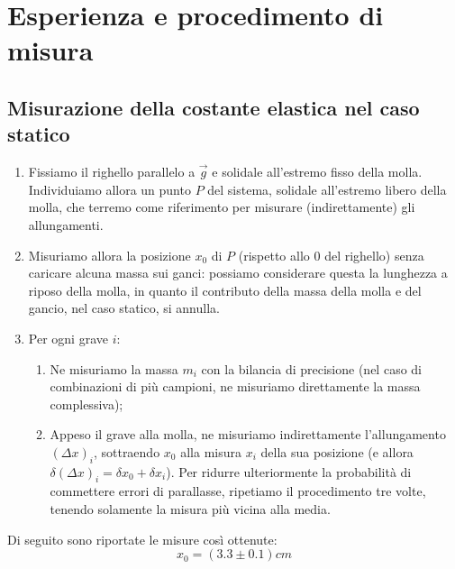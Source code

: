 \documentclass{article}
\begin{document}

\section{Esperienza e procedimento di misura}
\subsection{Misurazione della costante elastica nel caso statico}
\begin{enumerate}
    \item Fissiamo il righello parallelo a $\vec{g}$ e solidale
          all’estremo fisso della molla.
          Individuiamo allora un punto $P$ del sistema, solidale all’estremo
          libero della molla, che terremo come riferimento per misurare
          (indirettamente) gli allungamenti.
    \item Misuriamo allora la posizione $x_0$ di $P$
          (rispetto allo 0 del righello) senza caricare
          alcuna massa sui ganci: possiamo considerare questa la
          lunghezza a riposo della molla, in quanto il contributo
          della massa della molla e del gancio, nel caso statico, si annulla.
    \item Per ogni grave $i$:
    \begin{enumerate}
        \item Ne misuriamo la massa $m_i$ con la bilancia di precisione
              (nel caso di combinazioni di più campioni, ne misuriamo
              direttamente la massa complessiva);
        \item Appeso il grave alla molla, ne misuriamo indirettamente l'allungamento
        $\left(\Delta x\right)_i$, sottraendo $x_0$ alla misura $x_i$
        della sua posizione (e allora $\delta (\Delta x)_i = \delta x_0 + \delta x_i$).
        Per ridurre ulteriormente la probabilità di commettere errori di parallasse,
        ripetiamo il procedimento tre volte, tenendo solamente la misura più vicina alla media.
    \end{enumerate}
\end{enumerate}


Di seguito sono riportate le misure così ottenute:
\[x_0 = \left(3.3\pm 0.1\right)\unit{cm}\]
\end{document}
